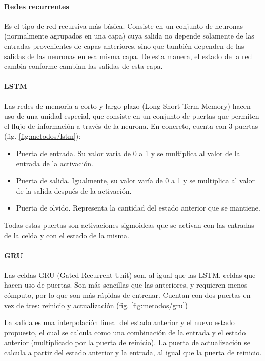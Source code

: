 \paragraph{Redes recurrentes}
Es el tipo de red recursiva más básica. Consiste en un conjunto de neuronas (normalmente agrupados en una capa) cuya salida no depende solamente de las entradas provenientes de capas anteriores, sino que también dependen de las salidas de las neuronas en esa misma capa. De esta manera, el estado de la red cambia conforme cambian las salidas de esta capa.
\paragraph{LSTM}
Las redes de memoria a corto y largo plazo (Long Short Term Memory) \cite{hochreiter1997long}\cite{colah} hacen uso de una unidad especial, que consiste en un conjunto de puertas que permiten el flujo de información a través de la neurona. En concreto, cuenta con 3 puertas (fig. \ref{fig:metodos/lstm}):

\begin{itemize}
	\item Puerta de entrada. Su valor varía de 0 a 1 y se multiplica al valor de la entrada de la activación.
	\item Puerta de salida. Igualmente, su valor varía de 0 a 1 y se multiplica al valor de la salida después de la activación.
	\item Puerta de olvido. Representa la cantidad del estado anterior que se mantiene.
\end{itemize}

Todas estas puertas son activaciones sigmoideas que se activan con las entradas de la celda y con el estado de la misma.
\paragraph{GRU}
Las celdas GRU (Gated Recurrent Unit) \cite{chung2014empirical} son, al igual que las LSTM, celdas que hacen uso de puertas. Son más sencillas que las anteriores, y requieren menos cómputo, por lo que son más rápidas de entrenar. Cuentan con dos puertas en vez de tres: reinicio y actualización (fig. \ref{fig:metodos/gru})

La salida es una interpolación lineal del estado anterior y el nuevo estado propuesto, el cual se calcula como una combinación de la entrada y el estado anterior (multiplicado por la puerta de reinicio). La puerta de actualización se calcula a partir del estado anterior y la entrada, al igual que la puerta de reinicio.

